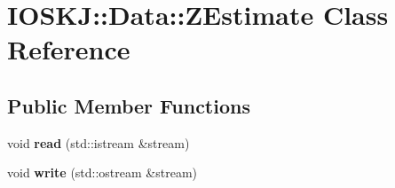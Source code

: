 \hypertarget{classIOSKJ_1_1Data_1_1ZEstimate}{\section{I\-O\-S\-K\-J\-:\-:Data\-:\-:Z\-Estimate Class Reference}
\label{classIOSKJ_1_1Data_1_1ZEstimate}
}
\subsection*{Public Member Functions}
\begin{DoxyCompactItemize}
\item 
\hypertarget{classIOSKJ_1_1Data_1_1ZEstimate_afd875241b51d49785e50acc239d7806e}{void {\bfseries read} (std\-::istream \&stream)}\label{classIOSKJ_1_1Data_1_1ZEstimate_afd875241b51d49785e50acc239d7806e}

\item 
\hypertarget{classIOSKJ_1_1Data_1_1ZEstimate_a952dba16d22242db687179289e576b08}{void {\bfseries write} (std\-::ostream \&stream)}\label{classIOSKJ_1_1Data_1_1ZEstimate_a952dba16d22242db687179289e576b08}

\end{DoxyCompactItemize}

